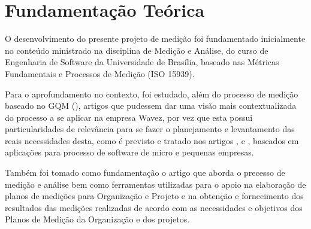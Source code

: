 \chapter{Fundamentação Teórica}

O desenvolvimento do presente projeto de medição foi fundamentado inicialmente no conteúdo ministrado na disciplina de Medição e Análise, do curso de Engenharia de Software da Universidade de Brasília, baseado nas Métricas Fundamentais e Processos de Medição (ISO 15939).

Para o aprofundamento no contexto, foi estudado, além do processo de medição baseado no GQM (\cite{GQM2009}), artigos que pudessem dar uma visão mais contextualizada do processo a se aplicar na empresa Wavez, por vez que esta possui particularidades de relevância para se fazer o planejamento e levantamento das reais necessidades desta, como é previsto e tratado nos artigos \cite{franca1998mediccao}, \cite{anacleto2004metodo} e \cite{salviano2006proposta}, baseados em aplicações para processo de software de micro e pequenas empresas.

Também foi tomado como fundamentação o artigo \cite{schnaider2004abordagem} que aborda o precesso de medição e análise bem como ferramentas utilizadas para o apoio na elaboração de planos de medições para Organização e Projeto e na obtenção e fornecimento dos resultados das medições realizadas de acordo com as necessidades e objetivos dos Planos de Medição da
Organização e dos projetos.








 
 
